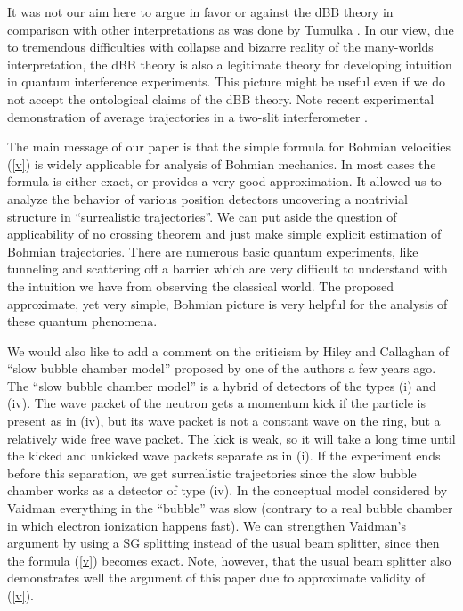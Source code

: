 \documentclass[12pt,preprint,tightenlines]{elsarticle}
\begin{document}
It was not our aim here to argue in favor or against the dBB theory
in comparison with other interpretations as was done by Tumulka \cite{tumulka:1220}. In our view, due to tremendous difficulties
with collapse and bizarre reality of the many-worlds interpretation,
the dBB theory is also a  legitimate theory for developing intuition in quantum interference
experiments.   This picture might be useful even if we
do not accept the ontological claims of the dBB theory. Note recent experimental demonstration of average trajectories in a two-slit interferometer \cite{Steinberg2011}.

 The main message
of our paper is that the simple formula for Bohmian velocities (\ref{v})
is widely applicable for analysis of Bohmian mechanics. In most cases the formula is
either exact, or provides a very good approximation. It allowed us to analyze
the behavior of various position detectors uncovering a nontrivial
structure in ``surrealistic trajectories''.  We can
put aside the question of applicability of no crossing
theorem and just make simple explicit   estimation of Bohmian trajectories.
There are numerous basic quantum experiments, like tunneling and scattering off a barrier
which are very difficult to understand with the intuition we have
from observing the classical world. The proposed approximate, yet very simple, Bohmian picture
is very helpful for the analysis of these quantum phenomena.



We would also like to add a comment on the criticism   by Hiley and Callaghan \cite{hiley2006delayed} of ``slow bubble
chamber model'' \cite{kill} proposed by one of the authors a few years ago.
The ``slow bubble chamber model'' is a hybrid of detectors of
the types (i) and (iv). The wave packet of the neutron gets a momentum
kick if the particle is present as in (iv), but its wave packet is
not a constant wave on the ring, but a relatively wide free wave packet.
The kick is weak, so it will take a long time until the kicked and
unkicked wave packets separate as in (i). If the experiment ends before
this separation, we get surrealistic trajectories since the slow bubble
chamber works as a detector of type (iv). In the conceptual model
considered by Vaidman \cite{kill} everything in the ``bubble'' was slow
(contrary to a real bubble chamber in which electron ionization happens
fast). We can strengthen Vaidman's argument  by using a SG splitting
instead of the usual beam splitter, since then the formula (\ref{v}) becomes exact.
Note, however, that the usual beam splitter also demonstrates well the argument of
this paper due to approximate validity of  (\ref{v}).
\end{document}
